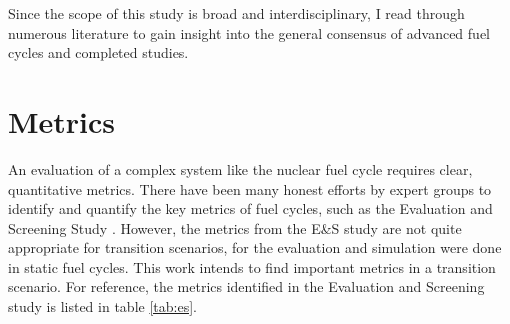 
Since the scope of this study is broad and interdisciplinary,
I read through numerous literature to gain insight into the
general consensus of advanced fuel cycles and completed studies.


\section{Metrics}

An evaluation of a complex system like the nuclear fuel cycle
requires clear, quantitative metrics.
There have been many honest efforts by expert groups
to identify and quantify the key metrics of fuel cycles,
 such as the Evaluation and Screening Study
\cite{wigeland_nuclear_2014}. However, the metrics from the E\&S study
are not quite appropriate for transition scenarios, for the evaluation and simulation
were done in static fuel cycles. This work intends to find important
metrics in a transition scenario.
For reference, the metrics
identified in the Evaluation and Screening study is listed in
table \ref{tab:es}.

